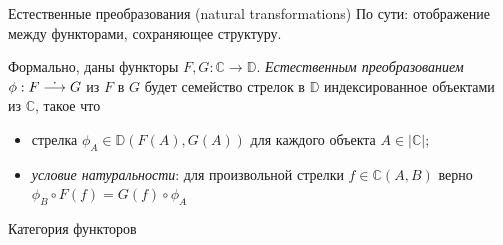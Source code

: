 \documentclass[
  russian,
  aspectratio=169,
  xcolor={svgnames},
  hyperref={colorlinks,citecolor=DeepPink4,linkcolor=DarkRed,urlcolor=DarkBlue}]{beamer}
\begin{document}
\begin{frame}[fragile]{Естественные преобразования (natural transformations)}
По сути: отображение между функторами, сохраняющее структуру.\vspace{0.4cm}

Формально, даны функторы $F,G : \mathbb{C} \rightarrow \mathbb{D}$. \textit{Естественным преобразованием} 
$\phi : F \overset{\text{\normalsize .}}\longrightarrow G$ из $F$ в $G$ будет 
семейство стрелок в $\mathbb{D}$ индексированное объектами из $\mathbb{C}$, такое что
\begin{itemize}
 \item стрелка $\phi_{A} \in \mathbb{D}(F(A), G(A))$ для каждого объекта
 $A \in |\mathbb{C}|$;
 \item \textit{условие натуральности}: для произвольной стрелки $f \in \mathbb{C}(A, B)$ верно $\phi_{B} \circ F(f)=G(f) \circ \phi_{A}$ 
\end{itemize}

\end{frame}

\begin{frame}[fragile]{Категория функторов}
\end{frame}
\end{document}
